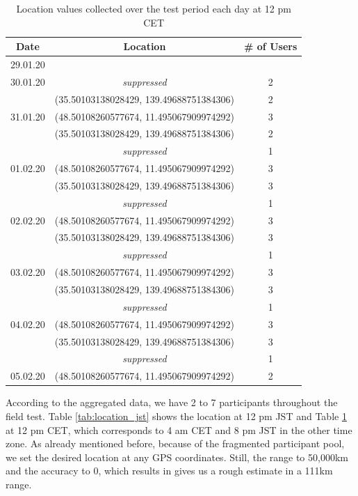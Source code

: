 \begin{table}[htbp]
    \centering
    \begin{tabular}{|c|c|c|} 
        \hline
        \textbf{Date} & \textbf{Location} & \textbf{\# of Users}\\ [0.5ex] 
        \hline
        29.01.20 &  & \\ 
        \hline
        30.01.20 &\textit{suppressed} & 2 \\ 
        & (35.50103138028429, 139.49688751384306) & 2 \\
        \hline
        31.01.20 & (48.50108260577674, 11.495067909974292) & 3 \\ 
        & (35.50103138028429, 139.49688751384306) & 2 \\
        &\textit{suppressed} & 1 \\
        \hline
        01.02.20 & (48.50108260577674, 11.495067909974292) & 3 \\ 
        & (35.50103138028429, 139.49688751384306) & 3 \\
        &\textit{suppressed} & 1 \\
        \hline
        02.02.20 & (48.50108260577674, 11.495067909974292) & 3 \\ 
        & (35.50103138028429, 139.49688751384306) & 3 \\
        &\textit{suppressed} & 1 \\
        \hline
        03.02.20 & (48.50108260577674, 11.495067909974292) & 3 \\ 
        & (35.50103138028429, 139.49688751384306) & 3 \\
        &\textit{suppressed} & 1 \\
        \hline
        04.02.20 & (48.50108260577674, 11.495067909974292) & 3 \\ 
        & (35.50103138028429, 139.49688751384306) & 3 \\
        &\textit{suppressed} & 1 \\
        \hline
        05.02.20 & (48.50108260577674, 11.495067909974292) & 2 \\ 
        \hline
    \end{tabular}
    \caption{Location values collected over the test period each day at 12 pm CET}
    \label{tab:location_cet}
\end{table}

According to the aggregated data, we have 2 to 7 participants throughout the field test. Table \ref{tab:location_jst} shows the location at 12 pm JST and Table \ref{tab:location_cet} at 12 pm CET, which corresponds to 4 am CET and 8 pm JST in the other time zone. As already mentioned before, because of the fragmented participant pool, we set the desired location at any GPS coordinates. Still, the range to 50,000km and the accuracy to 0, which results in gives us a rough estimate in a 111km range.

